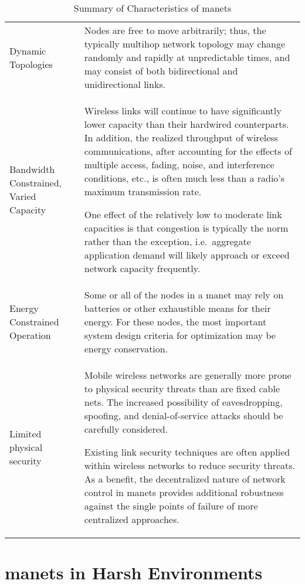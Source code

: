\begin{table}
  \begin{tabularx}{\textwidth}{p{2cm}X}\toprule
    Dynamic Topologies & Nodes are free to move arbitrarily; thus, the typically multihop network topology may change randomly and rapidly at unpredictable times, and may consist of both bidirectional and unidirectional links.
\\
    Bandwidth Constrained, Varied Capacity & Wireless links will continue to have significantly lower capacity than their hardwired counterparts.
In addition, the realized throughput of wireless communications, after accounting for the effects of multiple access, fading, noise, and interference conditions, etc., is often much less than a radio's maximum transmission rate.
\par
One effect of the relatively low to moderate link capacities is that congestion is typically the norm rather than the exception, i.e.\  aggregate application demand will likely approach or exceed network capacity frequently.\\
    Energy Constrained Operation &  Some or all of the nodes in a \gls{manet} may rely on batteries or other exhaustible means for their energy.
For these nodes, the most important system design criteria for optimization may be energy conservation.\\
    Limited physical security & Mobile wireless networks are generally more prone to physical security threats than are fixed cable nets.
The increased possibility of eavesdropping, spoofing, and denial-of-service attacks should be carefully considered.\par
Existing link security techniques are often applied within wireless networks to reduce security threats.
As a benefit, the decentralized nature of network control in \gls{manet}s provides additional robustness against the single points of failure of more centralized approaches.\\

\end{tabularx}
\caption[Summary of Characteristics of \gls{manet}s]{Summary of Characteristics of \gls{manet}s\cite{Corson1999}}
\label{tab:manet_characteristics}
\end{table}

\section{\glspl{manet} in Harsh Environments}

